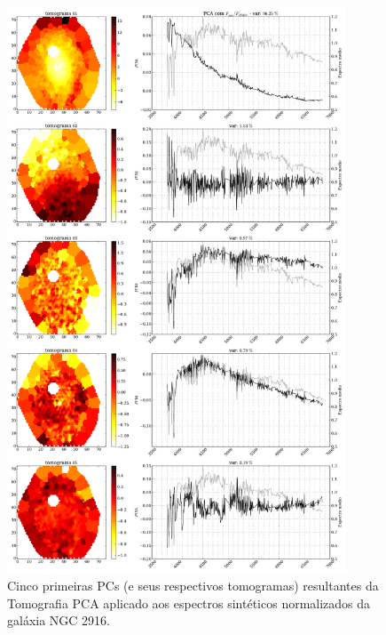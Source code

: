\begin{figure}
    \includegraphics[width=0.9\textwidth]{figuras/K0277-tomo-syn-norm.pdf}
    \caption[Tomogramas de 1 a 5 da gal\'axia NGC 2916 - $F_{syn} / F_{\lambda 5365}$ .]
    {Cinco primeiras PCs (e seus respectivos tomogramas) resultantes da Tomografia PCA aplicado aos espectros
    sintéticos normalizados da galáxia NGC 2916.}
    \label{fig:K0277tomofsynnorm}
\end{figure}

